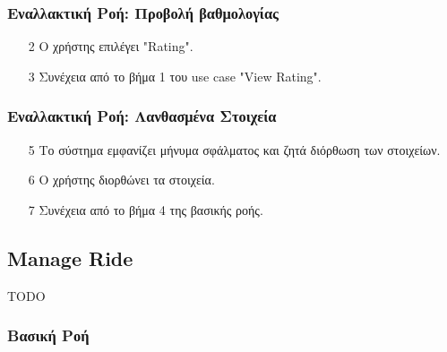 \subsubsection{Εναλλακτική Ροή: Προβολή βαθμολογίας}

\begin{enumerate}
    \item[2] Ο χρήστης επιλέγει "Rating".
    \item[3] Συνέχεια από το βήμα 1 του use case "View Rating".
\end{enumerate}

\subsubsection{Εναλλακτική Ροή: Λανθασμένα Στοιχεία}

\begin{enumerate}
    \item[5] Το σύστημα εμφανίζει μήνυμα σφάλματος και ζητά διόρθωση των στοιχείων.
    \item[6] Ο χρήστης διορθώνει τα στοιχεία.
    \item[7] Συνέχεια από το βήμα 4 της βασικής ροής.
\end{enumerate}

\newpage

\subsection{Manage Ride}

TODO

\subsubsection{Βασική Ροή}

